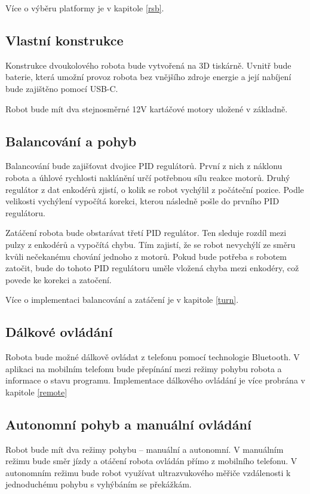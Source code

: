 Více o výběru platformy je v kapitole \ref{rsb}.

\subsection*{Vlastní konstrukce}
Konstrukce dvoukolového robota bude vytvořená na 3D tiskárně. Uvnitř bude baterie, která umožní provoz robota bez vnějšího zdroje energie a její nabíjení bude zajištěno pomocí USB-C. 

Robot bude mít dva stejnosměrné 12V kartáčové motory uložené v základně.

\subsection*{Balancování a pohyb}
Balancování bude zajišťovat dvojice PID regulátorů. První z nich z náklonu robota a úhlové rychlosti naklánění určí potřebnou sílu reakce motorů. Druhý regulátor z dat enkodérů zjistí, o kolik se robot vychýlil z počáteční pozice. Podle velikosti vychýlení vypočítá korekci, kterou následně pošle do prvního PID regulátoru.

Zatáčení robota bude obstarávat třetí PID regulátor. Ten sleduje rozdíl mezi pulzy z enkodérů a vypočítá chybu. Tím zajistí, že se robot nevychýlí ze směru kvůli nečekanému chování jednoho z motorů. Pokud bude potřeba s robotem zatočit, bude do tohoto PID regulátoru uměle vložená chyba mezi enkodéry, což povede ke korekci a zatočení. 

Více o implementaci balancování a zatáčení je v kapitole \ref{turn}.

\subsection*{Dálkové ovládání}
Robota bude možné dálkově ovládat z telefonu pomocí technologie Bluetooth. V aplikaci na mobilním telefonu bude přepínání mezi režimy pohybu robota a informace o stavu programu. Implementace dálkového ovládání je více probrána v kapitole \ref{remote}

\subsection*{Autonomní pohyb a manuální ovládání}
Robot bude mít dva režimy pohybu -- manuální a autonomní. V manuálním režimu bude směr jízdy a otáčení robota ovládán přímo z mobilního telefonu. V autonomním režimu bude robot využívat ultrazvukového měřiče vzdálenosti k jednoduchému pohybu s vyhýbáním se překážkám.


